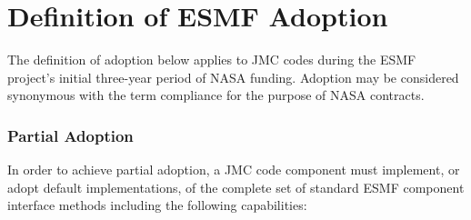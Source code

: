 \section{Definition of ESMF Adoption}
\label{sec:implications}

The definition of adoption below applies to JMC codes during the
ESMF project's initial three-year period of NASA funding.  Adoption
may be considered synonymous with the term compliance for the 
purpose of NASA contracts.

\subsubsection{Partial Adoption}
In order to achieve partial adoption, a JMC code component must 
implement, or adopt default implementations, of the complete set of 
standard ESMF component interface methods including the following
capabilities:

